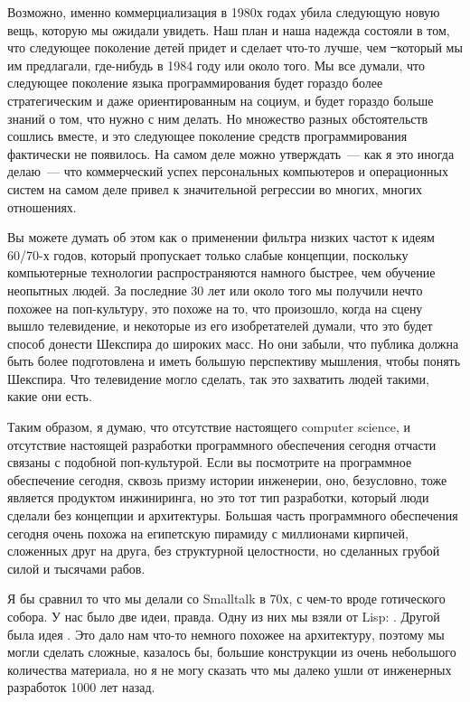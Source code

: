 \secdown


Возможно, именно коммерциализация в 1980х годах убила следующую новую вещь, которую мы ожидали увидеть.
Наш план и наша надежда состояли в том, что следующее поколение детей придет и сделает что-то лучше, 
чем \st\ который мы им предлагали, где-нибудь в 1984 году или около того.
Мы все думали, что следующее поколение языка программирования будет гораздо более стратегическим и 
даже ориентированным на социум, и будет гораздо больше знаний о том, что нужно с ним делать.
Но множество разных обстоятельств сошлись вместе, и это следующее поколение средств программирования фактически не появилось.
На самом деле можно утверждать\ --- как я это иногда делаю\ --- что коммерческий успех
персональных компьютеров и операционных систем на самом деле привел к значительной регрессии во многих, многих отношениях.

Вы можете думать об этом как о применении фильтра низких частот к идеям 60/70-х годов,
который пропускает только слабые концепции, поскольку компьютерные технологии распространяются
намного быстрее, чем обучение неопытных людей.
За последние 30 лет или около того мы получили нечто похожее на поп-культуру, 
это похоже на то, что произошло, когда на сцену вышло телевидение, и некоторые из его 
изобретателей думали, что это будет способ донести Шекспира до широких масс.
Но они забыли, что публика должна быть более подготовлена и иметь большую перспективу мышления, чтобы понять Шекспира.
Что телевидение могло сделать, так это захватить людей такими, какие они есть.

Таким образом, я думаю, что отсутствие настоящего computer science, и отсутствие 
настоящей разработки программного обеспечения сегодня отчасти связаны с подобной поп-культурой.
Если вы посмотрите на программное обеспечение сегодня, сквозь призму истории инженерии, 
оно, безусловно, тоже является продуктом инжиниринга, но это тот тип разработки,
который люди сделали без концепции и архитектуры.
Большая часть программного обеспечения сегодня очень похожа на египетскую пирамиду
с миллионами кирпичей, сложенных друг на друга, без структурной целостности,
но сделанных грубой силой и тысячами рабов.

Я бы сравнил то что мы делали со Smalltalk в 70х, с чем-то вроде готического собора.
У нас было две идеи, правда. Одну из них мы взяли от Lisp: .
Другой была идея . Это дало нам что-то немного похожее на архитектуру, 
поэтому мы могли сделать сложные, казалось бы, большие конструкции из очень 
небольшого количества материала, но я не могу сказать что мы далеко 
ушли от инженерных разработок 1000 лет назад.

